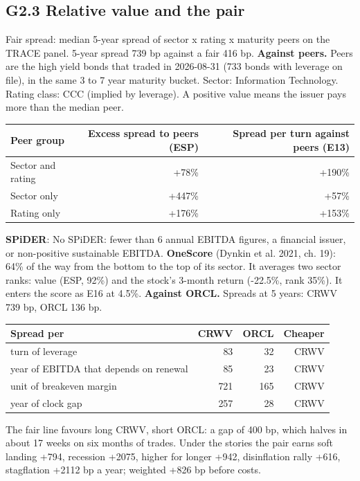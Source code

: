 \documentclass[11pt,a4paper]{article}
\begin{document}
\subsection*{G2.3 Relative value and the pair}
Fair spread: median 5-year spread of sector x rating x maturity peers on the TRACE panel. 5-year spread 739 bp against a fair 416 bp.
\textbf{Against peers.} Peers are the high yield bonds that traded in 2026-08-31 (733 bonds with leverage on file), in the same 3 to 7 year maturity bucket. Sector: Information Technology. Rating class: CCC (implied by leverage). A positive value means the issuer pays more than the median peer.
\begin{center}\footnotesize\setlength{\tabcolsep}{3.5pt}\begin{tabular}{@{}lrr@{}}\toprule
Peer group & Excess spread to peers (ESP) & Spread per turn against peers (E13) \\\midrule
Sector and rating & +78\% & +190\% \\
Sector only & +447\% & +57\% \\
Rating only & +176\% & +153\% \\
\bottomrule\end{tabular}\end{center}
\textbf{SPiDER}: No SPiDER: fewer than 6 annual EBITDA figures, a financial issuer, or non-positive sustainable EBITDA.
\textbf{OneScore} (Dynkin et al. 2021, ch. 19): 64\% of the way from the bottom to the top of its sector. It averages two sector ranks: value (ESP, 92\%) and the stock's 3-month return (-22.5\%, rank 35\%). It enters the score as E16 at 4.5\%.
\textbf{Against ORCL.} Spreads at 5 years: CRWV 739 bp, ORCL 136 bp.
\begin{center}\footnotesize\setlength{\tabcolsep}{3.5pt}\begin{tabular}{@{}lrrr@{}}\toprule
Spread per & CRWV & ORCL & Cheaper \\\midrule
turn of leverage & 83 & 32 & CRWV \\
year of EBITDA that depends on renewal & 85 & 23 & CRWV \\
unit of breakeven margin & 721 & 165 & CRWV \\
year of clock gap & 257 & 28 & CRWV \\
\bottomrule\end{tabular}\end{center}
The fair line favours long CRWV, short ORCL: a gap of 400 bp, which halves in about 17 weeks on six months of trades. Under the stories the pair earns soft landing +794, recession +2075, higher for longer +942, disinflation rally +616, stagflation +2112 bp a year; weighted +826 bp before costs.
\end{document}
